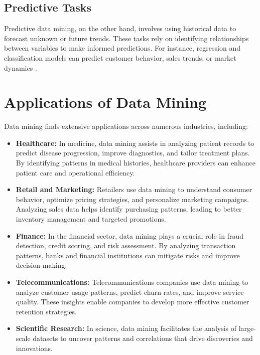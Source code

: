 \subsection{Predictive Tasks}
Predictive data mining, on the other hand, involves using historical data to forecast unknown or future trends. These tasks rely on identifying relationships between variables to make informed predictions. For instance, regression and classification models can predict customer behavior, sales trends, or market dynamics \cite{Fezari:2018}.

\section{Applications of Data Mining}

Data mining finds extensive applications across numerous industries, including:

\begin{itemize}
	\item \textbf{Healthcare:}  
	In medicine, data mining assists in analyzing patient records to predict disease progression, improve diagnostics, and tailor treatment plans. By identifying patterns in medical histories, healthcare providers can enhance patient care and operational efficiency.
	
	\item \textbf{Retail and Marketing:}  
	Retailers use data mining to understand consumer behavior, optimize pricing strategies, and personalize marketing campaigns. Analyzing sales data helps identify purchasing patterns, leading to better inventory management and targeted promotions.
	
	\item \textbf{Finance:}  
	In the financial sector, data mining plays a crucial role in fraud detection, credit scoring, and risk assessment. By analyzing transaction patterns, banks and financial institutions can mitigate risks and improve decision-making.
	
	\item \textbf{Telecommunications:}  
	Telecommunications companies use data mining to analyze customer usage patterns, predict churn rates, and improve service quality. These insights enable companies to develop more effective customer retention strategies.
	
	\item \textbf{Scientific Research:}  
	In science, data mining facilitates the analysis of large-scale datasets to uncover patterns and correlations that drive discoveries and innovations.
\end{itemize}

